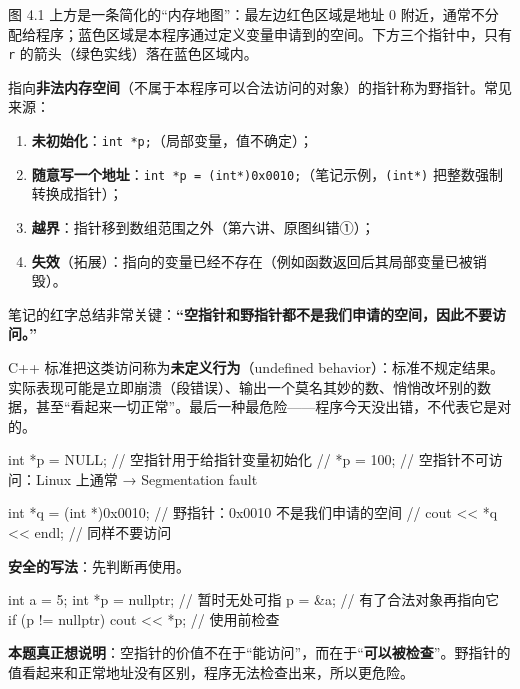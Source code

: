 \documentclass[UTF8,a4paper,11pt,fontset=none,zihao=-4]{ctexart}
\newcommand{\ci}[1]{{\circfont #1}}
\newcommand{\cpp}[1]{\lstinline[style=cpp,basicstyle=\ttfamily,numbers=none]{#1}}
\newcommand{\cc}[1]{\texttt{#1}}
\begin{document}
图 4.1 上方是一条简化的“内存地图”：最左边红色区域是地址 0 附近，通常不分配给程序；蓝色区域是本程序通过定义变量申请到的空间。下方三个指针中，只有 \cc{r} 的箭头（绿色实线）落在蓝色区域内。

\begin{definitionbox}[野指针]
指向\textbf{非法内存空间}（不属于本程序可以合法访问的对象）的指针称为野指针。常见来源：
\begin{enumerate}[leftmargin=1.8em,label=(\arabic*)]
  \item \textbf{未初始化}：\cpp{int *p;}（局部变量，值不确定）；
  \item \textbf{随意写一个地址}：\cpp{int *p = (int*)0x0010;}（笔记示例，\cc{(int*)} 把整数强制转换成指针）；
  \item \textbf{越界}：指针移到数组范围之外（第六讲、原图纠错\ci{①}）；
  \item \textbf{失效}（拓展）：指向的变量已经不存在（例如函数返回后其局部变量已被销毁）。
\end{enumerate}
\end{definitionbox}

\begin{intuitionbox}
笔记的红字总结非常关键：\textbf{“空指针和野指针都不是我们申请的空间，因此不要访问。”}

C++ 标准把这类访问称为\textbf{未定义行为}（undefined behavior）：标准不规定结果。实际表现可能是立即崩溃（段错误）、输出一个莫名其妙的数、悄悄改坏别的数据，甚至“看起来一切正常”。最后一种最危险——程序今天没出错，不代表它是对的。
\end{intuitionbox}

\begin{examplebox}
\begin{code}
int *p = NULL;       // 空指针用于给指针变量初始化
// *p = 100;         // 空指针不可访问：Linux 上通常 → Segmentation fault

int *q = (int *)0x0010;     // 野指针：0x0010 不是我们申请的空间
// cout << *q << endl;      // 同样不要访问
\end{code}
\textbf{安全的写法}：先判断再使用。
\begin{code}
int a = 5;
int *p = nullptr;             // 暂时无处可指
p = &a;                       // 有了合法对象再指向它
if (p != nullptr) cout << *p; // 使用前检查
\end{code}
\textbf{本题真正想说明}：空指针的价值不在于“能访问”，而在于“\textbf{可以被检查}”。野指针的值看起来和正常地址没有区别，程序无法检查出来，所以更危险。
\end{examplebox}
\end{document}
